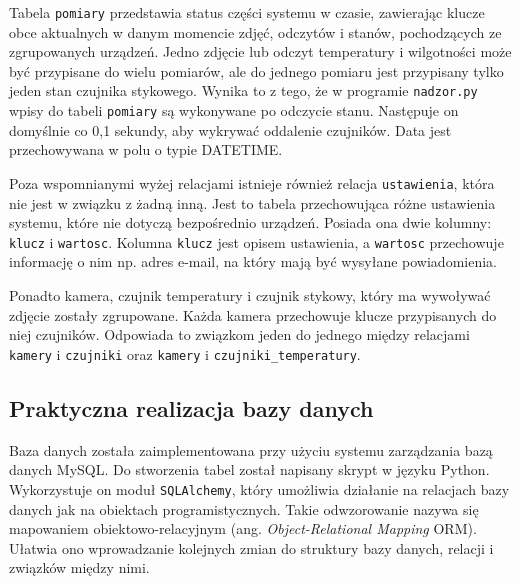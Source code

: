 \documentclass[a4paper,11pt,twoside]{article}
\begin{document}
Tabela \texttt{pomiary} przedstawia status części systemu w czasie, zawierając klucze obce aktualnych w danym momencie zdjęć, odczytów i stanów, pochodzących ze zgrupowanych urządzeń. Jedno zdjęcie lub odczyt temperatury i wilgotności może być przypisane do wielu pomiarów, ale do jednego pomiaru jest przypisany tylko jeden stan czujnika stykowego. Wynika to z tego, że w programie \texttt{nadzor.py} wpisy do tabeli \texttt{pomiary} są wykonywane po odczycie stanu. Następuje on domyślnie co 0,1 sekundy, aby wykrywać oddalenie czujników. Data jest przechowywana w polu o typie DATETIME. 
 
Poza wspomnianymi wyżej relacjami istnieje również relacja \texttt{ustawienia}, która nie jest w związku z żadną inną. Jest to tabela przechowująca różne ustawienia systemu, które nie dotyczą bezpośrednio urządzeń. Posiada ona dwie kolumny: \texttt{klucz} i \texttt{wartosc}. Kolumna \texttt{klucz} jest opisem ustawienia, a \texttt{wartosc} przechowuje informację o nim np. adres e-mail, na który mają być wysyłane powiadomienia. 

Ponadto kamera, czujnik temperatury i czujnik stykowy, który ma wywoływać zdjęcie zostały zgrupowane. Każda kamera przechowuje klucze przypisanych do niej czujników. Odpowiada to związkom jeden do jednego między relacjami \texttt{kamery} i \texttt{czujniki} oraz \texttt{kamery} i \texttt{czujniki{\_}temperatury}.

\subsection{Praktyczna realizacja bazy danych}
Baza danych została zaimplementowana przy użyciu systemu zarządzania bazą danych MySQL. Do stworzenia tabel został napisany skrypt w języku Python. Wykorzystuje on moduł \texttt{SQLAlchemy}, który umożliwia działanie na relacjach bazy danych jak na obiektach programistycznych. Takie odwzorowanie nazywa się mapowaniem obiektowo-relacyjnym (ang. \textit{Object-Relational Mapping} ORM). Ułatwia ono wprowadzanie kolejnych zmian do struktury bazy danych, relacji i związków między nimi.
\end{document}
